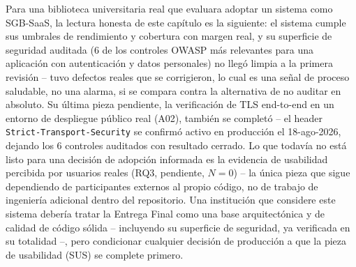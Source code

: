 Para una biblioteca universitaria real que evaluara adoptar un sistema
como SGB-SaaS, la lectura honesta de este capítulo es la siguiente: el
sistema cumple sus umbrales de rendimiento y cobertura con margen real, y
su superficie de seguridad auditada (6 de los controles OWASP más
relevantes para una aplicación con autenticación y datos personales) no
llegó limpia a la primera revisión -- tuvo defectos reales que se
corrigieron, lo cual es una señal de proceso saludable, no una alarma, si
se compara contra la alternativa de no auditar en absoluto. Su última
pieza pendiente, la verificación de TLS end-to-end en un entorno de
despliegue público real (A02), también se completó -- el header
\texttt{Strict-Transport-Security} se confirmó activo en producción el
18-ago-2026, dejando los 6 controles auditados con resultado cerrado. Lo
que todavía no está listo para una decisión de adopción informada es la
evidencia de usabilidad percibida por usuarios reales (RQ3, pendiente,
$N=0$) -- la única pieza que sigue dependiendo de participantes externos
al propio código, no de trabajo de ingeniería adicional dentro del
repositorio. Una institución que considere este sistema debería tratar
la Entrega Final como una base arquitectónica y de calidad de código
sólida -- incluyendo su superficie de seguridad, ya verificada en su
totalidad --, pero condicionar cualquier decisión de producción a que la
pieza de usabilidad (SUS) se complete primero.
